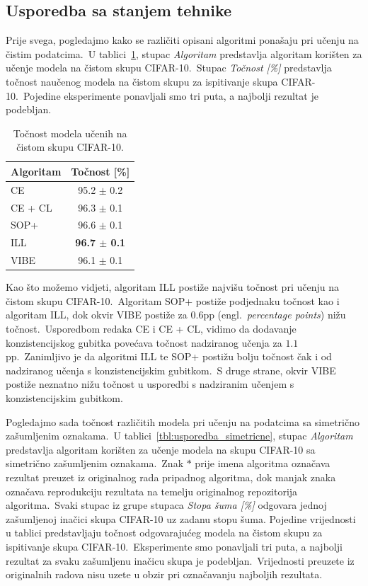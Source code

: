 \documentclass[diplomskirad]{fer}
\begin{document}
\subsection{Usporedba sa stanjem tehnike}
\label{sub:usporedba_zasumljene}

Prije svega, pogledajmo kako se različiti opisani algoritmi ponašaju pri učenju na čistim podatcima.\ 
U tablici~\ref{tbl:usporedba_ciste}, stupac \textit{Algoritam} predstavlja algoritam korišten za učenje modela na čistom skupu CIFAR-10.\ 
Stupac \textit{Točnost [\%]} predstavlja točnost naučenog modela na čistom skupu za ispitivanje skupa CIFAR-10.\ 
Pojedine eksperimente ponavljali smo tri puta, a najbolji rezultat je podebljan.\ 

\pagebreak

\begin{table}[htb]
  \caption{Točnost modela učenih na čistom skupu CIFAR-10.}
  \label{tbl:usporedba_ciste}
  \centering
  \begin{tabular}{l||c}
  Algoritam & Točnost [\%] \\ \hline \hline
  CE & 95.2 $\pm$ 0.2 \\
  CE + CL & 96.3 $\pm$ 0.1 \\ \hline
  SOP+ & 96.6 $\pm$ 0.1 \\
  ILL & \textbf{96.7 $\pm$ 0.1} \\ \hline
  VIBE & 96.1 $\pm$ 0.1 \\
  \end{tabular}
\end{table}

Kao što možemo vidjeti, algoritam ILL postiže najvišu točnost pri učenju na čistom skupu CIFAR-10.\ Algoritam SOP+ postiže podjednaku točnost kao i algoritam ILL, dok okvir VIBE postiže za $0.6$pp (engl.\ \textit{percentage points}) nižu točnost.\ 
Usporedbom redaka CE i CE + CL, vidimo da dodavanje konzistencijskog gubitka povećava točnost nadziranog učenja za $1.1$pp.\ Zanimljivo je da algoritmi ILL te SOP+ postižu bolju točnost čak i od nadziranog učenja s konzistencijskim gubitkom.\ 
S druge strane, okvir VIBE postiže neznatno nižu točnost u usporedbi s nadziranim učenjem s konzistencijskim gubitkom.\ 

Pogledajmo sada točnost različitih modela pri učenju na podatcima sa simetrično zašumljenim oznakama.\ 
U tablici~\ref{tbl:usporedba_simetricne}, stupac \textit{Algoritam} predstavlja algoritam korišten za učenje modela na skupu CIFAR-10 sa simetrično zašumljenim oznakama.\ 
Znak $*$ prije imena algoritma označava rezultat preuzet iz originalnog rada pripadnog algoritma, dok manjak znaka označava reprodukciju rezultata na temelju originalnog repozitorija algoritma.\
Svaki stupac iz grupe stupaca \textit{Stopa šuma [\%]} odgovara jednoj zašumljenoj inačici skupa CIFAR-10 uz zadanu stopu šuma.
Pojedine vrijednosti u tablici predstavljaju točnost odgovarajućeg modela na čistom skupu za ispitivanje skupa CIFAR-10.\ 
Eksperimente smo ponavljali tri puta, a najbolji rezultat za svaku zašumljenu inačicu skupa je podebljan.\
Vrijednosti preuzete iz originalnih radova nisu uzete u obzir pri označavanju najboljih rezultata.\ 
\end{document}
